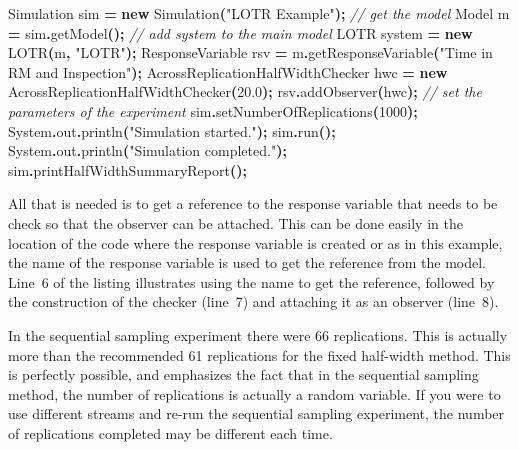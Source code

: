 \documentclass[
]{book}
\newenvironment{Shaded}{\begin{snugshade}}{\end{snugshade}}
\newcommand{\BuiltInTok}[1]{#1}
\newcommand{\CommentTok}[1]{\textcolor[rgb]{0.56,0.35,0.01}{\textit{#1}}}
\newcommand{\DecValTok}[1]{\textcolor[rgb]{0.00,0.00,0.81}{#1}}
\newcommand{\FloatTok}[1]{\textcolor[rgb]{0.00,0.00,0.81}{#1}}
\newcommand{\FunctionTok}[1]{\textcolor[rgb]{0.00,0.00,0.00}{#1}}
\newcommand{\KeywordTok}[1]{\textcolor[rgb]{0.13,0.29,0.53}{\textbf{#1}}}
\newcommand{\NormalTok}[1]{#1}
\newcommand{\OperatorTok}[1]{\textcolor[rgb]{0.81,0.36,0.00}{\textbf{#1}}}
\newcommand{\StringTok}[1]{\textcolor[rgb]{0.31,0.60,0.02}{#1}}
\theoremstyle{definition}
\theoremstyle{definition}
\theoremstyle{definition}
\theoremstyle{definition}
\theoremstyle{remark}
\begin{document}
\begin{Shaded}
\begin{Highlighting}[]
\NormalTok{Simulation sim }\OperatorTok{=} \KeywordTok{new} \FunctionTok{Simulation}\OperatorTok{(}\StringTok{"LOTR Example"}\OperatorTok{);}
\CommentTok{// get the model}
\NormalTok{Model m }\OperatorTok{=}\NormalTok{ sim}\OperatorTok{.}\FunctionTok{getModel}\OperatorTok{();}
\CommentTok{// add system to the main model}
\NormalTok{LOTR system }\OperatorTok{=} \KeywordTok{new} \FunctionTok{LOTR}\OperatorTok{(}\NormalTok{m}\OperatorTok{,} \StringTok{"LOTR"}\OperatorTok{);}
\NormalTok{ResponseVariable rsv }\OperatorTok{=}\NormalTok{ m}\OperatorTok{.}\FunctionTok{getResponseVariable}\OperatorTok{(}\StringTok{"Time in RM and Inspection"}\OperatorTok{);}
\NormalTok{AcrossReplicationHalfWidthChecker hwc }\OperatorTok{=} \KeywordTok{new} \FunctionTok{AcrossReplicationHalfWidthChecker}\OperatorTok{(}\FloatTok{20.0}\OperatorTok{);}
\NormalTok{rsv}\OperatorTok{.}\FunctionTok{addObserver}\OperatorTok{(}\NormalTok{hwc}\OperatorTok{);}
\CommentTok{// set the parameters of the experiment}
\NormalTok{sim}\OperatorTok{.}\FunctionTok{setNumberOfReplications}\OperatorTok{(}\DecValTok{1000}\OperatorTok{);}
\BuiltInTok{System}\OperatorTok{.}\FunctionTok{out}\OperatorTok{.}\FunctionTok{println}\OperatorTok{(}\StringTok{"Simulation started."}\OperatorTok{);}
\NormalTok{sim}\OperatorTok{.}\FunctionTok{run}\OperatorTok{();}
\BuiltInTok{System}\OperatorTok{.}\FunctionTok{out}\OperatorTok{.}\FunctionTok{println}\OperatorTok{(}\StringTok{"Simulation completed."}\OperatorTok{);}
\NormalTok{sim}\OperatorTok{.}\FunctionTok{printHalfWidthSummaryReport}\OperatorTok{();}
\end{Highlighting}
\end{Shaded}

All that is needed is to get a reference to the response
variable that needs to be check so that the observer can be attached.
This can be done easily in the location of the code where the response
variable is created or as in this example, the name of the response
variable is used to get the reference from the model. Line~6 of the
listing illustrates using the name to get the reference, followed by the
construction of the checker (line~7) and attaching it as an observer
(line~8).

In the sequential sampling experiment there were 66 replications. This
is actually more than the recommended 61 replications for the fixed
half-width method. This is perfectly possible, and emphasizes the fact
that in the sequential sampling method, the number of replications is
actually a random variable. If you were to use different streams and
re-run the sequential sampling experiment, the number of replications
completed may be different each time.
\end{document}
